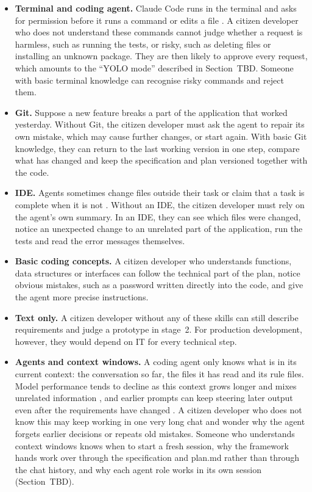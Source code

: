\documentclass[10pt,a4paper]{article}
\begin{document}
\begin{itemize}
    \item \textbf{Terminal and coding agent.} Claude Code runs in the terminal and asks for permission before it runs a command or edits a file \parencite{galster2026}. A citizen developer who does not understand these commands cannot judge whether a request is harmless, such as running the tests, or risky, such as deleting files or installing an unknown package. They are then likely to approve every request, which amounts to the \enquote{YOLO mode} described in Section~TBD. Someone with basic terminal knowledge can recognise risky commands and reject them.
    \item \textbf{Git.} Suppose a new feature breaks a part of the application that worked yesterday. Without Git, the citizen developer must ask the agent to repair its own mistake, which may cause further changes, or start again. With basic Git knowledge, they can return to the last working version in one step, compare what has changed and keep the specification and plan versioned together with the code.
    \item \textbf{IDE.} Agents sometimes change files outside their task or claim that a task is complete when it is not \parencite{alhasan2026,uddin2026}. Without an IDE, the citizen developer must rely on the agent's own summary. In an IDE, they can see which files were changed, notice an unexpected change to an unrelated part of the application, run the tests and read the error messages themselves.
    \item \textbf{Basic coding concepts.} A citizen developer who understands functions, data structures or interfaces can follow the technical part of the plan, notice obvious mistakes, such as a password written directly into the code, and give the agent more precise instructions.
    \item \textbf{Text only.} A citizen developer without any of these skills can still describe requirements and judge a prototype in stage~2. For production development, however, they would depend on IT for every technical step.
    \item \textbf{Agents and context windows.} A coding agent only knows what is in its current context: the conversation so far, the files it has read and its rule files. Model performance tends to decline as this context grows longer and mixes unrelated information \parencite{hong2025context}, and earlier prompts can keep steering later output even after the requirements have changed \parencite{sarkar2025}. A citizen developer who does not know this may keep working in one very long chat and wonder why the agent forgets earlier decisions or repeats old mistakes. Someone who understands context windows knows when to start a fresh session, why the framework hands work over through the specification and plan.md rather than through the chat history, and why each agent role works in its own session (Section~TBD).
\end{itemize}
\end{document}
